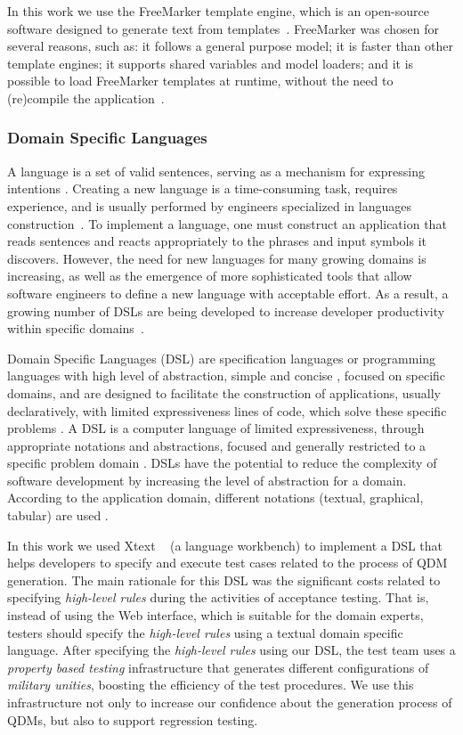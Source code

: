 \documentclass[AMA,STIX1COL]{WileyNJD-v2}
\newcommand{\callers}{\emph{high-level rules}\xspace}
\begin{document}
In this work we use the FreeMarker template engine, which is an open-source software designed to generate text from templates~\cite{radjenovic2009}. FreeMarker was chosen for several reasons, such as: it follows a general purpose model; it is faster than other template engines; it supports shared variables and model loaders; and it is possible to load FreeMarker templates at runtime, without the need to (re)compile the application~\cite{benato2017,parr2006}.


\subsubsection{Domain Specific Languages}

A language is a set of valid sentences, serving as a mechanism for expressing intentions \cite{parr2010}. Creating a new language is a time-consuming task, requires experience, and is usually performed by engineers specialized in languages construction~\cite{karsai2014}. To implement a language, one must construct an application that reads sentences and reacts appropriately to the phrases and input symbols it discovers. However, the need for new languages for many growing domains is increasing, as well as the emergence of more sophisticated tools that allow software engineers to define a new language with acceptable effort. As a result, a growing number of DSLs are being developed to increase developer productivity within specific domains~\cite{karsai2014}. 


Domain Specific Languages (DSL) are specification languages or programming languages with high level of abstraction, simple and concise \cite{raja2010}, focused on specific domains, and are designed to facilitate the construction of applications, usually declaratively, with limited expressiveness lines of code, which solve these specific problems \cite{neeraj2017}. A DSL is a computer language of limited expressiveness, through appropriate notations and abstractions, focused and generally restricted to a specific problem domain \cite{fowler2013,vanDeursen2000}. DSLs have the potential to reduce the complexity of software development by increasing the level of abstraction for a domain. According to the application domain, different notations (textual, graphical, tabular) are used \cite{pfeiffer2008}.


In this work we used Xtext ~\cite{eysholdt2010} (a language workbench) to implement a DSL that helps developers to specify and execute test cases related to the process of QDM generation. The main rationale for this DSL was the significant costs related to specifying \callers during the activities of acceptance testing.
{\color{blue}That is, instead of using the Web interface, which is suitable for the domain experts, testers should specify the \callers using a textual domain specific language. After specifying the \callers using our DSL, the test team 
  uses a \emph{property based testing} infrastructure that
  generates different configurations of \emph{military unities}, boosting the
  efficiency of the test procedures}. We use
this infrastructure not only to increase our confidence
about the generation process of
QDMs, but also to support regression testing.
\end{document}
